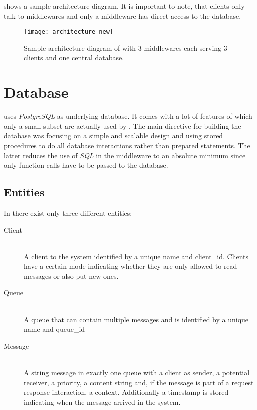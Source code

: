 \documentclass[a4paper, oneside]{csthesis}
\begin{document}
     shows a sample architecture diagram.
    It is important to note, that clients only talk to middlewares and only a
    middleware has direct access to the database.

    \begin{figure}[h]
        \centering
            \texttt{[image: architecture-new]}
            \caption{Sample architecture diagram of \telesto{} with $3$
            middlewares each serving $3$ clients and one central database.}
            \label{fig:telesto-architecture}
    \end{figure}

\section{Database}
\label{sec:db}
    
    \telesto{} uses {\it PostgreSQL} as underlying database. It comes with a lot
    of features of which only a small subset are actually used by \telesto. The
    main directive for building the database was focusing on a simple and
    scalable design and using stored procedures to do all database interactions
    rather than prepared statements. The latter reduces the use of {\it SQL} in
    the middleware to an absolute minimum since only function calls have to be
    passed to the database.
    
\subsection{Entities}
    In \telesto{} there exist only three different entities:
    
    \begin{description}
    \item[Client] \ \\
        A client to the system identified by a unique name and client\_id.
        Clients have a certain mode indicating whether they are only allowed to
        read messages or also put new ones.
    \item[Queue] \ \\
        A queue that can contain multiple messages and is identified by a unique
        name and queue\_id
    \item[Message] \ \\
        A string message in exactly one queue with a client as sender, a
        potential receiver, a priority, a content string and, if the message is
        part of a request response interaction, a context. Additionally a
        timestamp is stored indicating when the message arrived in the system.
    \end{description}
\end{document}
